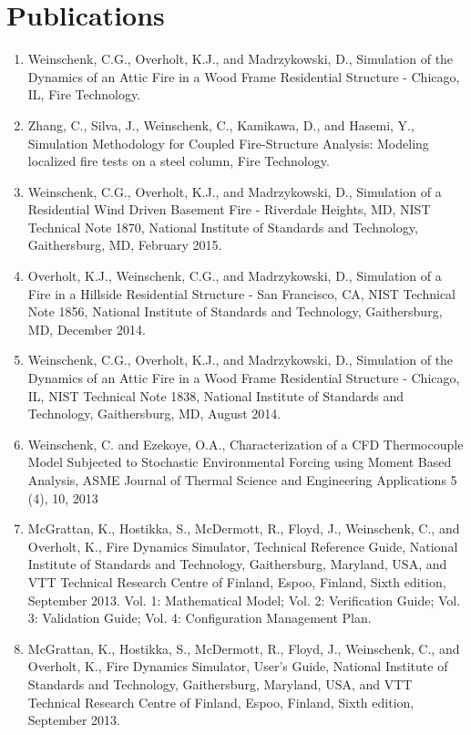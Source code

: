 \documentclass[10pt,letterpaper]{article}
\begin{document}
\section*{Publications}
\begin{enumerate}
\item Weinschenk, C.G., Overholt, K.J., and Madrzykowski, D., Simulation of the Dynamics of an Attic Fire in a Wood Frame Residential Structure - Chicago, IL, Fire Technology.
\item Zhang, C., Silva, J., Weinschenk, C., Kamikawa, D., and Hasemi, Y., Simulation Methodology for Coupled Fire-Structure Analysis: Modeling localized fire tests on a steel column, Fire Technology.
\item Weinschenk, C.G., Overholt, K.J., and Madrzykowski, D., Simulation of a Residential Wind Driven Basement Fire - Riverdale Heights, MD, NIST Technical Note 1870, National Institute of Standards and Technology, Gaithersburg, MD, February 2015.
\item Overholt, K.J., Weinschenk, C.G., and Madrzykowski, D., Simulation of a Fire in a Hillside Residential Structure - San Francisco, CA, NIST Technical Note 1856, National Institute of Standards and Technology, Gaithersburg, MD, December 2014.
\item Weinschenk, C.G., Overholt, K.J., and Madrzykowski, D., Simulation of the Dynamics of an Attic Fire in a Wood Frame Residential Structure - Chicago, IL, NIST Technical Note 1838, National Institute of Standards and Technology, Gaithersburg, MD, August 2014.
\item  Weinschenk, C. and Ezekoye, O.A., Characterization of a CFD Thermocouple Model Subjected to Stochastic Environmental Forcing using Moment Based Analysis, ASME Journal of Thermal Science and Engineering Applications 5 (4), 10, 2013
\item McGrattan, K., Hostikka, S., McDermott, R., Floyd, J., Weinschenk, C., and Overholt, K., Fire Dynamics Simulator, Technical Reference Guide, National Institute of Standards and Technology, Gaithersburg, Maryland, USA, and VTT Technical Research Centre of Finland, Espoo, Finland, Sixth edition, September 2013. Vol. 1: Mathematical Model; Vol. 2: Verification Guide; Vol. 3: Validation Guide; Vol. 4: Configuration Management Plan.
\item McGrattan, K., Hostikka, S., McDermott, R., Floyd, J., Weinschenk, C., and Overholt, K., Fire Dynamics Simulator, User’s Guide, National Institute of Standards and Technology, Gaithersburg, Maryland, USA, and VTT Technical Research Centre of Finland, Espoo, Finland, Sixth edition, September 2013.

\end{enumerate}
\end{document}
